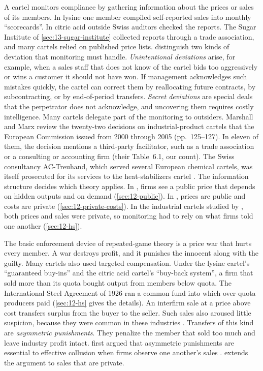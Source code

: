 A cartel monitors compliance by gathering information about the prices or sales of its members. In lysine one
member compiled self-reported sales into monthly ``scorecards''. In citric acid outside Swiss auditors checked the
reports. The Sugar Institute of \cref{sec:13-sugar-institute} collected reports through a trade association, and
many cartels relied on published price lists. \citet[p.~106]{MarshallMarx2012} distinguish two kinds of deviation
that monitoring must handle. \emph{Unintentional deviations} arise, for example, when a sales staff that does not
know of the cartel bids too aggressively or wins a customer it should not have won. If management acknowledges such
mistakes quickly, the cartel can correct them by reallocating future contracts, by subcontracting, or by
end-of-period transfers. \emph{Secret deviations} are special deals that the perpetrator does not acknowledge, and
uncovering them requires costly intelligence. Many cartels delegate part of the monitoring to outsiders. Marshall
and Marx review the twenty-two decisions on industrial-product cartels that the European Commission issued from 2000
through 2005 (pp.~125--127). In eleven of them, the decision mentions a third-party facilitator, such as a trade
association or a consulting or accounting firm (their Table~6.1, our count). The Swiss consultancy AC-Treuhand, which
served several European chemical cartels, was itself prosecuted for its services to the heat-stabilizers cartel
\citep[p.~197]{AskerNocke2021}. The information structure decides which theory applies.
In \citet{GreenPorter1984}, firms see a public price that depends on hidden outputs and on demand
(\cref{sec:12-public}). In \citet{AtheyBagwellSanchirico2004}, prices are public and costs are private
(\cref{sec:12-private-costs}). In the industrial cartels studied by \citet{HarringtonSkrzypacz2011}, both prices
and sales were private, so monitoring had to rely on what firms told one another (\cref{sec:12-hs}).

The basic enforcement device of repeated-game theory is a price war that hurts every member. A war destroys
profit, and it punishes the innocent along with the guilty. Many cartels also used targeted compensation. Under
the lysine cartel's ``guaranteed buy-ins'' and the citric acid cartel's ``buy-back system'', a firm that sold more
than its quota bought output from members below quota. The International Steel Agreement of 1926 ran a common fund
into which over-quota producers paid (\cref{sec:12-hs} gives the details). An interfirm sale at a price above cost transfers surplus from
the buyer to the seller. Such sales also aroused little suspicion, because they were common in these industries
\citep[p.~2433]{HarringtonSkrzypacz2011}. Transfers of this kind are \emph{asymmetric punishments}. They penalize
the member that sold too much and leave industry profit intact. \citet{HarringtonSkrzypacz2007} first argued that
asymmetric punishments are essential to effective collusion when firms observe one another's sales
\citep[p.~2442]{HarringtonSkrzypacz2011}.  extends the argument to sales that are private.


